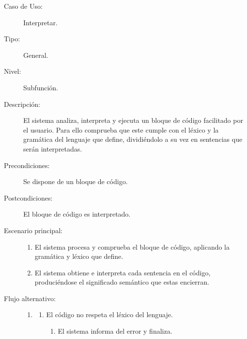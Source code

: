 \begin{description}
   \item[Caso de Uso:]  Interpretar.
   \item[Tipo:] General.
   \item[Nivel:]  Subfunción.
   \item[Descripción:] 
   El sistema analiza, interpreta y ejecuta un bloque de código facilitado por el usuario.
   Para ello comprueba que este cumple con el léxico y la gramática del lenguaje 
   que define, dividiéndolo a su vez en sentencias que serán interpretadas. 
   \item[Precondiciones:] 
   Se dispone de un bloque de código.
   \item[Postcondiciones:] 
   El bloque de código es interpretado.
   \item[Escenario principal:] \hfill
   \begin{enumerate}
   \item El sistema procesa y comprueba el bloque de código, aplicando
   la gramática y léxico que define.
   \item El sistema obtiene e interpreta cada sentencia en el código, produciéndose
   el significado semántico que estas encierran.
   \end{enumerate}
   \item[Flujo alternativo:] \hfill 
   \begin{enumerate} \itemsep1pt \parskip0pt 
   \setcounter{enumi}{0}
   \renewcommand{\labelenumi}{}
   \renewcommand{\labelenumiii}{\arabic{enumiii}.}
   \renewcommand{\labelenumii}{\arabic{enumi}\alph{enumii}.}
      \item 
      \begin {enumerate}
         \setcounter{enumii}{0}
         \item El código no respeta el léxico del lenguaje.
         \begin{enumerate}
         \item El sistema informa del error y finaliza.
         \end{enumerate}
      \end{enumerate}
   \end{enumerate}
   \begin{enumerate} \itemsep1pt \parskip0pt 

\end{enumerate}
\end{description}
